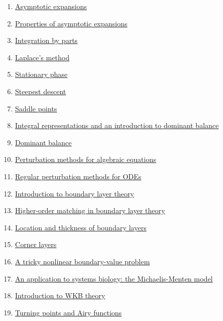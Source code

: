 \documentclass[11pt]{article}
\begin{document}
\begin{enumerate}
	\item \href{https://mp.weixin.qq.com/s/sq71mMisInVJuyHRySzlAw}{Asymptotic expansions}	%
	\item \href{https://mp.weixin.qq.com/s/KzIk0Oj7zLyB_Puo9COHuw}{Properties of asymptotic expansions}	%
	\item \href{https://mp.weixin.qq.com/s/qb6rrIVIlWOLocC_BRW_4w}{Integration by parts}	%
	\item \href{https://mp.weixin.qq.com/s/uIfjRhImaUFtXWRVjMQRAQ}{Laplace's method}	%
	\item \href{https://mp.weixin.qq.com/s/MZjEuLRphjS0iNl-caLZJg}{Stationary phase}	%
	\item \href{https://mp.weixin.qq.com/s/ByfE7JW91TmJDuQV8R0YFw}{Steepest descent}	%
	\item \href{https://mp.weixin.qq.com/s/fXvVQ6xx_moz8HlHRENjGA}{Saddle points}	%
	\item \href{https://mp.weixin.qq.com/s/f5UyTJVPoBfHx25iw0YViA}{Integral representations and an introduction to dominant balance}	%
	\item \href{https://mp.weixin.qq.com/s/gO9_j8554yTHZfZta38cDw}{Dominant balance}	%
	\item \href{https://mp.weixin.qq.com/s/my-M5878d6mktzOqrsRExA}{Perturbation methods for algebraic equations}	%
	\item \href{https://mp.weixin.qq.com/s/91bRTdyfNgZILGsDo5r7sg}{Regular perturbation methods for ODEs}	%
	\item \href{https://mp.weixin.qq.com/s/zA8542-rzl0dnJ1UClxRrw}{Introduction to boundary layer theory}	%
	\item \href{https://mp.weixin.qq.com/s/l1NGXmq7wrcXHcT_9JQUHw}{Higher-order matching in boundary layer theory}	%
	\item \href{https://mp.weixin.qq.com/s/k_tlsdXpBujNoGdtE2sIzw}{Location and thickness of boundary layers}	%
	\item \href{https://mp.weixin.qq.com/s/xdEtLg-j58nDsgEJyByq9g}{Corner layers}	%
	\item \href{https://mp.weixin.qq.com/s/F8ObieL75Ahj80lWuZ9ABA}{A tricky nonlinear boundary-value problem}	%
	\item \href{https://mp.weixin.qq.com/s/0Xs45-jAe63lXWbkloMLZA}{An application to systems biology: the Michaelis-Menten model}	%
	\item \href{https://mp.weixin.qq.com/s/eRKm6Xak3qxKTH1pAzr4gQ}{Introduction to WKB theory}	%
	\item \href{https://mp.weixin.qq.com/s/Z1Ls3uK0W_qV2s3o0nLv9w}{Turning points and Airy functions}	%

\end{enumerate}
\end{document}
